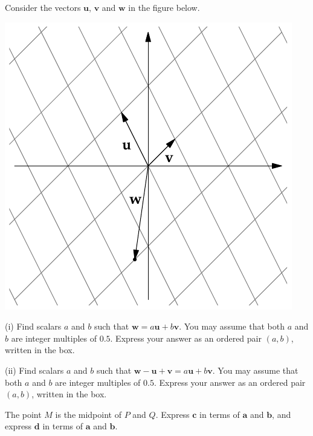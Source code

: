 \documentclass[svgnames]{watsonbook}
\begin{document}
\begin{exercise}{}{}
Consider the vectors $\mathbf{u}$, $\mathbf{v}$ and $\mathbf{w}$ in the figure below. 

\begin{center}
  \includegraphics{exercisefigures/parallelogram}
\end{center}

(i) Find scalars $a$ and $b$ such that $\mathbf{w} = a\mathbf{u} + b\mathbf{v}$. You may assume that both $a$ and $b$ are integer multiples of $0.5$. Express your answer as an ordered pair $(a,b)$, written in the box. 

(ii) Find scalars $a$ and $b$ such that $\mathbf{w} - \mathbf{u} + \mathbf{v} = a\mathbf{u} + b\mathbf{v}$. You may assume that both $a$ and $b$ are integer multiples of $0.5$. Express your answer as an ordered pair $(a,b)$, written in the box. 
\end{exercise}

\begin{exercise}{}{}
  \begin{minipage}[t]{0.58\textwidth}
    The point $M$ is the midpoint of $P$ and $Q$. Express $\mathbf{c}$
    in terms of $\mathbf{a}$ and $\mathbf{b}$, and express $\mathbf{d}$
    in terms of $\mathbf{a}$ and $\mathbf{b}$.
  \end{minipage}
  \begin{minipage}[t]{0.4\textwidth}
  \end{minipage}
\end{exercise}
\end{document}
